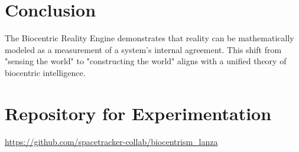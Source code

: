 \documentclass[12pt]{article}
\begin{document}
\section{Conclusion}
The Biocentric Reality Engine demonstrates that reality can be mathematically modeled as a measurement of a system's internal agreement. This shift from "sensing the world" to "constructing the world" aligns with a unified theory of biocentric intelligence.

\section{Repository for Experimentation}
\noindent
\url{https://github.com/spacetracker-collab/biocentrism_lanza}
\end{document}
